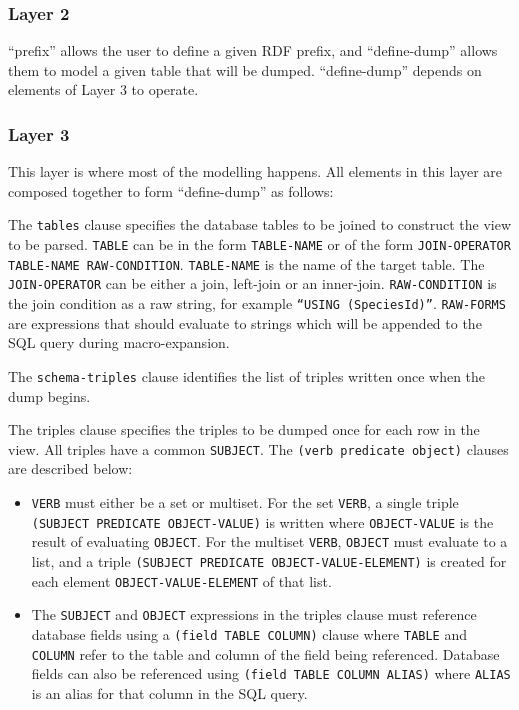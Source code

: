 \subsubsection{Layer 2}

``prefix'' allows the user to define a given RDF prefix, and ``define-dump'' allows them to model a given table that will be dumped.  ``define-dump'' depends on elements of Layer 3 to operate.

\subsubsection{Layer 3}
This layer is where most of the modelling happens.  All elements in this layer are composed together to form ``define-dump'' as follows:

The \texttt{tables} clause specifies the database tables to be joined to construct the view to be parsed.  \texttt{TABLE} can be in the form \texttt{TABLE-NAME} or of the form \texttt{JOIN-OPERATOR TABLE-NAME RAW-CONDITION}.  \texttt{TABLE-NAME} is the name of the target table.  The \texttt{JOIN-OPERATOR} can be either a join, left-join or an inner-join.  \texttt{RAW-CONDITION} is the join condition as a raw string, for example \texttt{``USING (SpeciesId)''}.  \texttt{RAW-FORMS} are expressions that should evaluate to strings which will be appended to the SQL query during macro-expansion.

The \texttt{schema-triples} clause identifies the list of triples written once when the dump begins.

The triples clause specifies the triples to be dumped once for each row in the view.  All triples have a common \texttt{SUBJECT}. The \texttt{(verb predicate object)} clauses are described below:

\begin{itemize}
\item \texttt{VERB} must either be a set or multiset. For the set \texttt{VERB}, a single triple \texttt{(SUBJECT PREDICATE OBJECT-VALUE)} is written where \texttt{OBJECT-VALUE} is the result of evaluating \texttt{OBJECT}. For the multiset \texttt{VERB}, \texttt{OBJECT} must evaluate to a list, and a triple \texttt{(SUBJECT PREDICATE OBJECT-VALUE-ELEMENT)} is created for each element \texttt{OBJECT-VALUE-ELEMENT} of that list.
\item The \texttt{SUBJECT} and \texttt{OBJECT} expressions in the triples clause must reference database fields using a \texttt{(field TABLE COLUMN)} clause where \texttt{TABLE} and \texttt{COLUMN} refer to the table and column of the field being referenced. Database fields can also be referenced using \texttt{(field TABLE COLUMN ALIAS)} where \texttt{ALIAS} is an alias for that column in the SQL query.
\end{itemize}

